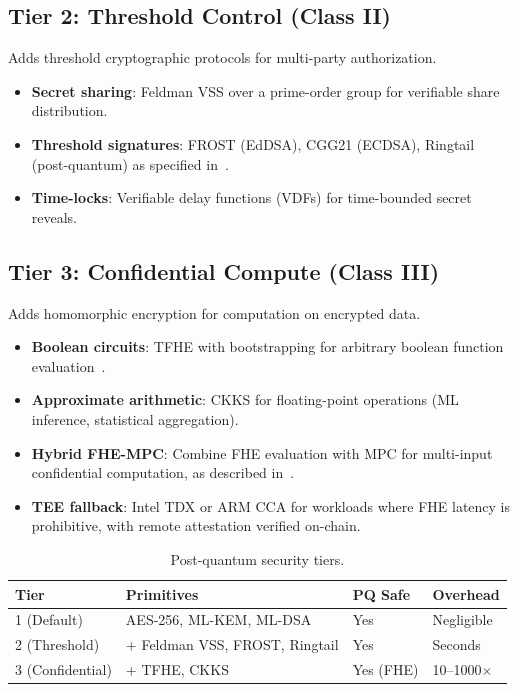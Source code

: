 \documentclass[11pt,a4paper]{article}
\begin{document}
\subsection{Tier 2: Threshold Control (Class II)}

Adds threshold cryptographic protocols for multi-party authorization.

\begin{itemize}[nosep]
  \item \textbf{Secret sharing}: Feldman VSS over a prime-order group for
        verifiable share distribution.
  \item \textbf{Threshold signatures}: FROST (EdDSA), CGG21 (ECDSA), Ringtail
        (post-quantum) as specified in~\cite{lux-mchain-mpc}.
  \item \textbf{Time-locks}: Verifiable delay functions (VDFs) for time-bounded
        secret reveals.
\end{itemize}

\subsection{Tier 3: Confidential Compute (Class III)}

Adds homomorphic encryption for computation on encrypted data.

\begin{itemize}[nosep]
  \item \textbf{Boolean circuits}: TFHE with bootstrapping for arbitrary boolean
        function evaluation~\cite{lux-tfhe}.
  \item \textbf{Approximate arithmetic}: CKKS for floating-point operations
        (ML inference, statistical aggregation).
  \item \textbf{Hybrid FHE-MPC}: Combine FHE evaluation with MPC for
        multi-input confidential computation, as described
        in~\cite{lux-fhe-mpc-hybrid}.
  \item \textbf{TEE fallback}: Intel TDX or ARM CCA for workloads where FHE
        latency is prohibitive, with remote attestation verified on-chain.
\end{itemize}

\begin{table}[H]
\centering
\caption{Post-quantum security tiers.}
\label{tab:pq}
\begin{tabular}{@{}llll@{}}
\toprule
\textbf{Tier} & \textbf{Primitives} & \textbf{PQ Safe} & \textbf{Overhead} \\
\midrule
1 (Default) & AES-256, ML-KEM, ML-DSA & Yes & Negligible \\
2 (Threshold) & + Feldman VSS, FROST, Ringtail & Yes & Seconds \\
3 (Confidential) & + TFHE, CKKS & Yes (FHE) & 10--1000$\times$ \\
\bottomrule
\end{tabular}
\end{table}
\end{document}
